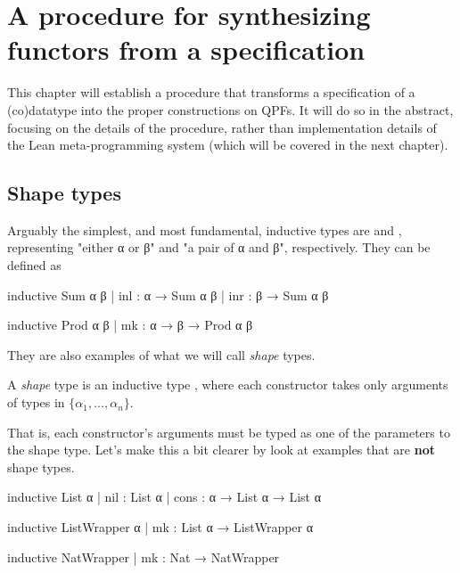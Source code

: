 
\chapter{A procedure for synthesizing functors from a specification}
\label{ch:procedure}

This chapter will establish a procedure that transforms a specification of a (co)datatype
into the proper constructions on QPFs.
It will do so in the abstract, focusing on the details of the procedure, rather than implementation
details of the Lean meta-programming system (which will be covered in the next chapter).


\section{Shape types}
\label{sec:shape_types}

Arguably the simplest, and most fundamental, inductive types are  and ,
representing "either α or β" and "a pair of α and β", respectively.
They can be defined as

\begin{center}
\begin{minipage}[t]{0.45\linewidth}
    \begin{leancode}
inductive Sum α β
  | inl : α → Sum α β
  | inr : β → Sum α β
    \end{leancode}
\end{minipage}
\begin{minipage}[t]{0.45\linewidth}
    \begin{leancode}    
inductive Prod α β
  | mk : α → β → Prod α β
    \end{leancode}
\end{minipage}
\end{center}

They are also examples of what we will call \emph{shape} types.
\begin{definition}
    A \emph{shape} type is an inductive type , 
    where each constructor takes only arguments of types in $\{α_1, ..., α_n\}$.
\end{definition}
That is, each constructor's arguments must be typed as one of the parameters to the shape type.
Let's make this a bit clearer by look at examples that are \textbf{not} shape types. 

\begin{leancode}
    inductive List α
      | nil  : List α 
      | cons : α → List α → List α

    inductive ListWrapper α
      | mk : List α → ListWrapper α

    inductive NatWrapper
      | mk : Nat → NatWrapper
\end{leancode}

